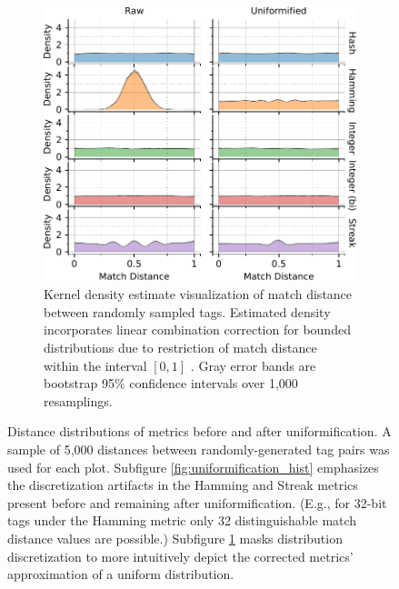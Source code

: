 \begin{figure}
\begin{center}
\begin{minipage}{\linewidth}
\begin{subfigure}[b]{\linewidth}
\begin{minipage}{0.75\textwidth}
\begin{center}
\includegraphics[width=\columnwidth]{img/uniformification/bitweight=0dot5+seed=1+title=low-score-distribution+viz=kde+_data_hathash_hash=75684cf1e73fb7f1+_script_fullcat_hash=73c1663bd9b49595+ext=}
\end{center}
\end{minipage}
\begin{minipage}{0.23\textwidth}
\caption{
Kernel density estimate visualization of match distance between randomly sampled tags.
Estimated density incorporates linear combination correction for bounded distributions due to restriction of match distance within the interval $[0,1]$ \citep{jones1993simple}.
Gray error bands are bootstrap 95\% confidence intervals over 1,000 resamplings.
}
\label{fig:uniformification_kde}
\end{minipage}
\end{subfigure}
\end{minipage}

\caption{
Distance distributions of metrics before and after uniformification.
A sample of 5,000 distances between randomly-generated tag pairs was used for each plot.
Subfigure \ref{fig:uniformification_hist} emphasizes the discretization artifacts in the Hamming and Streak metrics present before and remaining after uniformification.
(E.g., for 32-bit tags under the Hamming metric only 32 distinguishable match distance values are possible.)
Subfigure \ref{fig:uniformification_kde} masks distribution discretization to more intuitively depict the corrected metrics' approximation of a uniform distribution.
}
\label{fig:uniformification}

\end{center}
\end{figure}
